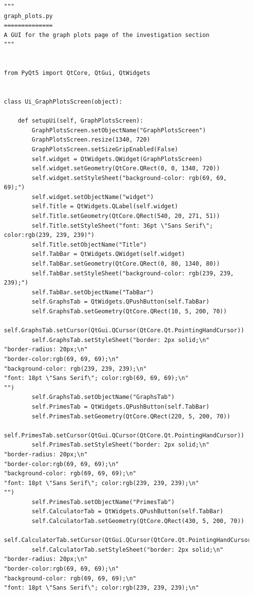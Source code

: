 \documentclass{article}
\begin{document}
\begin{lstlisting}
"""
graph_plots.py
==============
A GUI for the graph plots page of the investigation section
"""


from PyQt5 import QtCore, QtGui, QtWidgets


class Ui_GraphPlotsScreen(object):

    def setupUi(self, GraphPlotsScreen):
        GraphPlotsScreen.setObjectName("GraphPlotsScreen")
        GraphPlotsScreen.resize(1340, 720)
        GraphPlotsScreen.setSizeGripEnabled(False)
        self.widget = QtWidgets.QWidget(GraphPlotsScreen)
        self.widget.setGeometry(QtCore.QRect(0, 0, 1340, 720))
        self.widget.setStyleSheet("background-color: rgb(69, 69, 69);")
        self.widget.setObjectName("widget")
        self.Title = QtWidgets.QLabel(self.widget)
        self.Title.setGeometry(QtCore.QRect(540, 20, 271, 51))
        self.Title.setStyleSheet("font: 36pt \"Sans Serif\"; color:rgb(239, 239, 239)")
        self.Title.setObjectName("Title")
        self.TabBar = QtWidgets.QWidget(self.widget)
        self.TabBar.setGeometry(QtCore.QRect(0, 80, 1340, 80))
        self.TabBar.setStyleSheet("background-color: rgb(239, 239, 239);")
        self.TabBar.setObjectName("TabBar")
        self.GraphsTab = QtWidgets.QPushButton(self.TabBar)
        self.GraphsTab.setGeometry(QtCore.QRect(10, 5, 200, 70))
        self.GraphsTab.setCursor(QtGui.QCursor(QtCore.Qt.PointingHandCursor))
        self.GraphsTab.setStyleSheet("border: 2px solid;\n"
"border-radius: 20px;\n"
"border-color:rgb(69, 69, 69);\n"
"background-color: rgb(239, 239, 239);\n"
"font: 18pt \"Sans Serif\"; color:rgb(69, 69, 69);\n"
"")
        self.GraphsTab.setObjectName("GraphsTab")
        self.PrimesTab = QtWidgets.QPushButton(self.TabBar)
        self.PrimesTab.setGeometry(QtCore.QRect(220, 5, 200, 70))
        self.PrimesTab.setCursor(QtGui.QCursor(QtCore.Qt.PointingHandCursor))
        self.PrimesTab.setStyleSheet("border: 2px solid;\n"
"border-radius: 20px;\n"
"border-color:rgb(69, 69, 69);\n"
"background-color: rgb(69, 69, 69);\n"
"font: 18pt \"Sans Serif\"; color:rgb(239, 239, 239);\n"
"")
        self.PrimesTab.setObjectName("PrimesTab")
        self.CalculatorTab = QtWidgets.QPushButton(self.TabBar)
        self.CalculatorTab.setGeometry(QtCore.QRect(430, 5, 200, 70))
        self.CalculatorTab.setCursor(QtGui.QCursor(QtCore.Qt.PointingHandCursor))
        self.CalculatorTab.setStyleSheet("border: 2px solid;\n"
"border-radius: 20px;\n"
"border-color:rgb(69, 69, 69);\n"
"background-color: rgb(69, 69, 69);\n"
"font: 18pt \"Sans Serif\"; color:rgb(239, 239, 239);\n"

\end{lstlisting}
\end{document}
